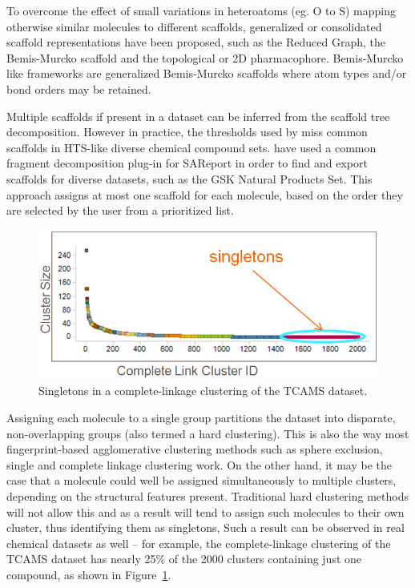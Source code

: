 \documentclass[journal=jacsat,manuscript=article]{achemso}
\newcommand*\fref[1]{Figure~\ref{fig:#1}}
\begin{document}
To overcome the effect of small variations in heteroatoms (eg. O to S) mapping
otherwise similar molecules to different scaffolds, generalized or consolidated
scaffold representations have been proposed, such as the Reduced
Graph\cite{Barker2003RG}, the Bemis-Murcko scaffold\cite{BemisMurcko1996} and
the topological or 2D pharmacophore\cite{Schneider1999ScafHopTP}. Bemis-Murcko
like frameworks \cite{Harper2004DDclus} are generalized Bemis-Murcko scaffolds
where atom types and/or bond orders may be retained.

Multiple scaffolds if present in a dataset can be inferred from the
scaffold tree decomposition\cite{ClarkLabute2008SAReport}. However in
practice, the thresholds used by \citeauthor{ClarkLabute2008SAReport}
miss common scaffolds in HTS-like diverse chemical compound
sets. \citeauthor{Bandyopadhyay2011ACS} have used a common fragment
decomposition plug-in for SAReport in order to find and export
scaffolds for diverse datasets, such as the GSK Natural Products
Set\cite{Coma2014}.  This approach assigns at most one scaffold for
each molecule, based on the order they are selected by the user from a
prioritized list.

\begin{figure}
\includegraphics[width=5.5in]{fig/singletons.png}
\caption{Singletons in a complete-linkage clustering of the TCAMS dataset.}
\label{fig:platypus}
\end{figure}

Assigning each molecule to a single group partitions the dataset into
disparate, non-overlapping groups (also termed a hard clustering).
This is also the way most fingerprint-based agglomerative clustering
methods such as sphere exclusion, single and complete linkage
clustering work\cite{Downs2003}. On the other hand, it may be the case
that a molecule could well be assigned simultaneously to multiple
clusters, depending on the structural features present. Traditional
hard clustering methods will not allow this and as a result will tend
to assign such molecules to their own cluster, thus identifying them
as singletons, Such a result can be observed in real chemical datasets
as well -- for example, the complete-linkage clustering of the TCAMS
dataset\cite{Gamo2010,Calderon2011} has nearly 25\% of the 2000
clusters containing just one compound, as shown in \fref{platypus}.
\end{document}

